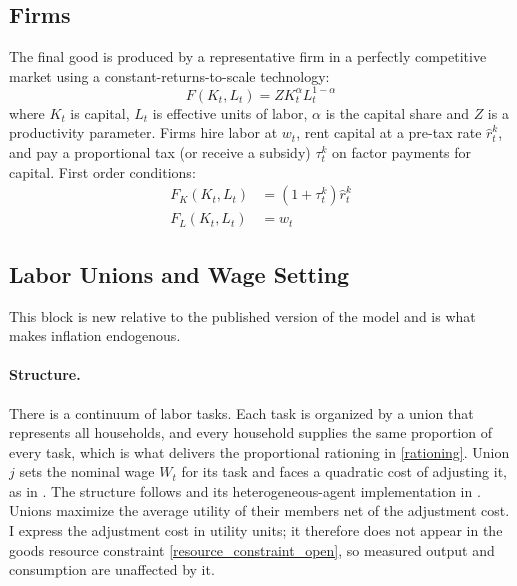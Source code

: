 \subsection{Firms}
The final good is produced by a representative firm in a perfectly competitive
market using a constant-returns-to-scale technology:
\begin{equation} \label{production_function}
    F(K_t,L_t) = Z K_t^\alpha L_t^{1-\alpha}
\end{equation}
where $K_t$ is capital, $L_t$ is effective units of labor, $\alpha$ is the
capital share and $Z$ is a productivity parameter. Firms hire labor at $w_t$,
rent capital at a pre-tax rate $\hat r^k_t$, and pay a proportional tax (or
receive a subsidy) $\tau^k_t$ on factor payments for capital. First order
conditions:
\begin{align}
    F_K(K_t,L_t) &= (1+\tau_t^k) \hat{r}_t^k \label{foc_firms1}\\
    F_L(K_t,L_t) &= w_t \label{foc_firms2}
\end{align}

\subsection{Labor Unions and Wage Setting} \label{unions}

This block is new relative to the published version of the model and is what
makes inflation endogenous.

\paragraph{Structure.} There is a continuum of labor tasks. Each task is
organized by a union that represents all households, and every household
supplies the same proportion of every task, which is what delivers the
proportional rationing in \eqref{rationing}. Union $j$ sets the nominal wage
$W_t$ for its task and faces a quadratic cost of adjusting it, as in
\textcite{Rotemberg-1982}. The structure follows
\textcite{Erceg-Henderson-Levin-2000} and its heterogeneous-agent
implementation in \textcite{Auclert-Rognlie-Straub-2024}. Unions maximize the
average utility of their members net of the adjustment cost. I express the
adjustment cost in utility units; it therefore does not appear in the goods
resource constraint \eqref{resource_constraint_open}, so measured output and
consumption are unaffected by it.

